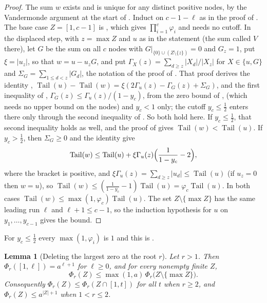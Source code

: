 \documentclass[11pt]{article}
\newtheorem{lemma}[theorem]{Lemma}
\DeclareMathOperator{\Tail}{Tail}
\begin{document}
\begin{proof}
The sum $w$ exists and is unique for any distinct positive nodes, by the
Vandermonde argument at the start of \cite[Section~2]{coefficient-mass}.  Induct on $c-1-\ell$ as in
the proof of \cite[Theorem~2.2]{coefficient-mass}.  The base case $Z=[1,c-1]$ is
\cite[Lemma~2.1]{coefficient-mass}, which gives $\prod_{i=1}^c\varphi_i$ and needs
no cutoff.  In the displaced step, with $z=\max Z$ and $u$ as in the
statement (the sum called $V$ there), let $G$ be the sum on all $c$ nodes with
$G|_{\{0\}\cup(Z\setminus\{z\})}=0$ and $G_z=1$, put $\xi=|u_z|$, so that
$w=u-u_zG$, and put $\Gamma_X(z)=\sum_{d\ge z}|X_d|/|X_z|$ for
$X\in\{u,G\}$ and $\Sigma_G=\sum_{1\le d<z}|G_d|$, the notation of the proof of
\cite[Theorem~2.2]{coefficient-mass}.  That proof derives the identity
\cite[eq.~(2)]{coefficient-mass},
$\Tail(u)-\Tail(w)=\xi(2\Gamma_u(z)-\Gamma_G(z)+\Sigma_G)$, and the first
inequality of \cite[eq.~(3)]{coefficient-mass},
$\Gamma_G(z)\le\Gamma_u(z)/(1-y_c)$, from the zero bound of
\cite[Section~2]{coefficient-mass}, \cite[Lemma~2.3]{coefficient-mass}
(which needs no upper bound on the nodes) and $y_c<1$ only; the cutoff
$y_c\le\frac12$ enters there only through the second inequality of
\cite[eq.~(3)]{coefficient-mass}.  So both hold here.  If $y_c\le\frac12$,
that second inequality holds as well, and the proof of
\cite[Theorem~2.2]{coefficient-mass} gives
$\Tail(w)<\Tail(u)$.  If $y_c>\frac12$, then $\Sigma_G\ge0$ and
the identity give
\[
  \Tail(w)\le\Tail(u)+\xi\Gamma_u(z)\Bigl(\frac1{1-y_c}-2\Bigr),
\]
where the bracket is positive, and
$\xi\Gamma_u(z)=\sum_{d\ge z}|u_d|\le\Tail(u)$ (if $u_z=0$ then $w=u$), so
$\Tail(w)\le(\frac1{1-y_c}-1)\Tail(u)=\varphi_c\Tail(u)$.  In both cases
$\Tail(w)\le\max(1,\varphi_c)\Tail(u)$.  The set $Z\setminus\{\max Z\}$ has
the same leading run $\ell$ and $\ell+1\le c-1$, so the induction hypothesis
for $u$ on $y_1,\ldots,y_{c-1}$ gives the bound.
\end{proof}

For $y_c\le\frac12$ every $\max(1,\varphi_i)$ is $1$ and this is
\cite[Theorem~2.2]{coefficient-mass}.

\begin{lemma}[Deleting the largest zero at the root $r$]\label{lem:confdelr}
Let $r>1$.  Then $\Phi_r([1,\ell])=a^{\ell+1}$ for $\ell\ge0$, and for every
nonempty finite $Z$,
\[
  \Phi_r(Z)\le\max(1,a)\,\Phi_r\bigl(Z\setminus\{\max Z\}\bigr).
\]
Consequently $\Phi_r(Z)\le\Phi_r(Z\cap[1,t])$ for all $t$ when $r\ge2$, and
$\Phi_r(Z)\le a^{|Z|+1}$ when $1<r\le2$.
\end{lemma}
\end{document}
